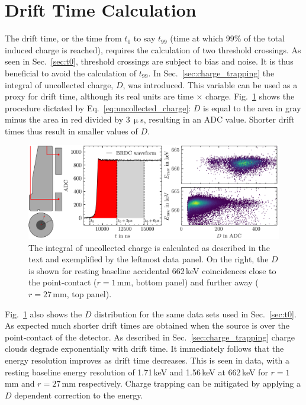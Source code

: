 \section{Drift Time Calculation}
The drift time, or the time from $t_0$ to say $t_{99}$ (time at which 99\% of the total induced charge is reached), requires the calculation of two threshold crossings. As seen in Sec.~\ref{sec:t0}, threshold crossings are subject to bias and noise. It is thus beneficial to avoid the calculation of $t_{99}$. In Sec.~\ref{sec:charge_trapping} the integral of uncollected charge, $D$, was introduced. This variable can be used as a proxy for drift time, although its real units are time $\times$ charge. Fig.~\ref{fig:dt_calculation} shows the procedure dictated by Eq.~\ref{eq:uncollected_charge}: $D$ is equal to the area in gray minus the area in red divided by 3\,$\upmu$s, resulting in an ADC value. Shorter drift times thus result in smaller values of $D$.
\begin{figure}[htb]
    \centering
    \includegraphics[width=6in]{figs/param/dt_calculation.png}
    \caption{The integral of uncollected charge is calculated as described in the text and exemplified by the leftmost data panel. On the right, the $D$ is shown for resting baseline accidental 662\,keV coincidences close to the point-contact ($r = 1$\,mm, bottom panel) and further away ($r = 27$\,mm, top panel).}
    \label{fig:dt_calculation}
\end{figure}

Fig.~\ref{fig:dt_calculation} also shows the $D$ distribution for the same data sets used in Sec.~\ref{sec:t0}. As expected much shorter drift times are obtained when the source is over the point-contact of the detector. As described in Sec.~\ref{sec:charge_trapping} charge clouds degrade exponentially with drift time. It immediately follows that the energy resolution improves as drift time decreases. This is seen in data, with a resting baseline energy resolution of 1.71\,keV and 1.56\,keV at 662\,keV for $r = 1$\,mm and $r = 27$\,mm respectively. Charge trapping can be mitigated by applying a $D$ dependent correction to the energy. 

